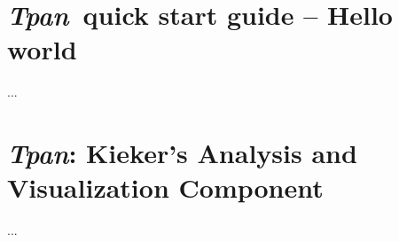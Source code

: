 \documentclass[a4paper,12pt]{scrartcl}
\newcommand{\tpan}{\textit{Tpan}}
\newcommand{\tpmonltw}{\textit{tpmonltw.jar}}
\newcommand{\aspectjweaverjar}{\textit{aspectjweaver.jar}}
\begin{document}
\section{\tpan\ quick start guide -- Hello world}\label{sec.tpan.tutorial}

...

\section{\tpan: Kieker's Analysis and Visualization Component}\label{sec.tpan}

... 


% 
% 

% 
% 



 

\end{document}
